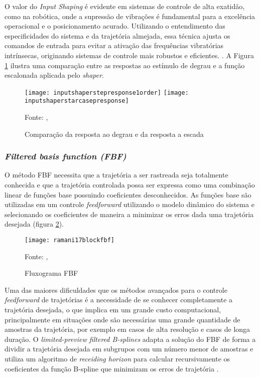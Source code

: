 O valor do \textit{Input Shaping} é evidente em sistemas de controle de alta exatidão, como na robótica, onde a supressão de vibrações é fundamental para a excelência operacional e o posicionamento acurado. Utilizando o entendimento das especificidades do sistema e da trajetória almejada, essa técnica ajusta os comandos de entrada para evitar a ativação das frequências vibratórias intrínsecas, originando sistemas de controle mais robustos e eficientes. \cite{singhose97}. A Figura \ref{fig:degr_vs_esc} ilustra uma comparação entre as respostas ao estímulo de degrau e a função escalonada aplicada pelo \textit{shaper}.

\begin{figure}[H]
    \centering
    \caption{Comparação da resposta ao degrau e da resposta a escada}
    \texttt{[image: inputshaperstepresponse1order]}
    \texttt{[image: inputshaperstarcasepresponse]}

    {\footnotesize Fonte: \citeauthor{singhose97}, \citeyear{singhose97}}
    \label{fig:degr_vs_esc}
\end{figure}

\subsubsection{\textit{Filtered basis function (FBF)}}
O método FBF necessita que a trajetória a ser rastreada seja totalmente conhecida e que a trajetória controlada possa ser expressa como uma combinação linear de funções base possuindo coeficientes desconhecidos. As funções base são utilizadas em um controle \textit{feedforward} utilizando o modelo dinâmico do sistema e selecionando os coeficientes de maneira a minimizar os erros dada uma trajetória desejada (figura \ref{fig:flowchart_fbf}).
\cite{ramani17}

\begin{figure}[H]
    \centering
    \caption{Fluxograma FBF}
    \texttt{[image: ramani17blockfbf]}

    {\footnotesize Fonte: \citeauthor{ramani17}, \citeyear{ramani17}}
    \label{fig:flowchart_fbf}
\end{figure}

Uma das maiores dificuldades que os métodos avançados para o controle \textit{feedforward} de trajetórias é a necessidade de se conhecer completamente a trajetória desejada, o que implica em um grande custo computacional, principalmente em situações onde são necessárias uma grande quantidade de amostras da trajetória, por exemplo em casos de alta resolução e casos de longa duração. O \textit{limited-preview filtered B-splines} adapta a solução do FBF de forma a dividir a trajetória desejada em subgrupos com um número menor de amostras e utiliza um algoritmo de \textit{receiding horizon} para calcular recursivamente os coeficientes da função B-spline que minimizam os erros de trajetória \cite{duan18}.

